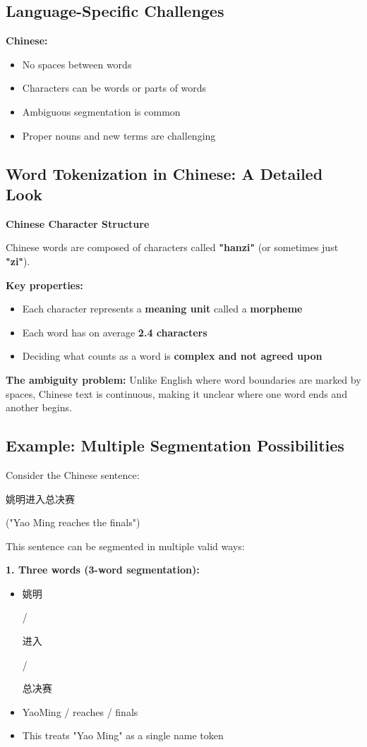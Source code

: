 \documentclass[11pt,a4paper]{article}
\theoremstyle{definition}
\theoremstyle{plain}
\theoremstyle{remark}
\begin{document}
\subsection{Language-Specific Challenges}

\textbf{Chinese:}
\begin{itemize}
    \item No spaces between words
    \item Characters can be words or parts of words
    \item Ambiguous segmentation is common
    \item Proper nouns and new terms are challenging
\end{itemize}

\subsection{Word Tokenization in Chinese: A Detailed Look}

\textbf{Chinese Character Structure}

Chinese words are composed of characters called \textbf{"hanzi"} (or sometimes just \textbf{"zi"}).

\textbf{Key properties:}
\begin{itemize}
    \item Each character represents a \textbf{meaning unit} called a \textbf{morpheme}
    \item Each word has on average \textbf{2.4 characters}
    \item Deciding what counts as a word is \textbf{complex and not agreed upon}
\end{itemize}

\textbf{The ambiguity problem:} Unlike English where word boundaries are marked by spaces, Chinese text is continuous, making it unclear where one word ends and another begins.

\subsection{Example: Multiple Segmentation Possibilities}

Consider the Chinese sentence: \begin{CJK}{UTF8}{gbsn}姚明进入总决赛\end{CJK} ("Yao Ming reaches the finals")

This sentence can be segmented in multiple valid ways:

\textbf{1. Three words (3-word segmentation):}
\begin{itemize}
    \item \begin{CJK}{UTF8}{gbsn}姚明\end{CJK} / \begin{CJK}{UTF8}{gbsn}进入\end{CJK} / \begin{CJK}{UTF8}{gbsn}总决赛\end{CJK}
    \item YaoMing / reaches / finals
    \item This treats "Yao Ming" as a single name token
\end{itemize}
\end{document}
